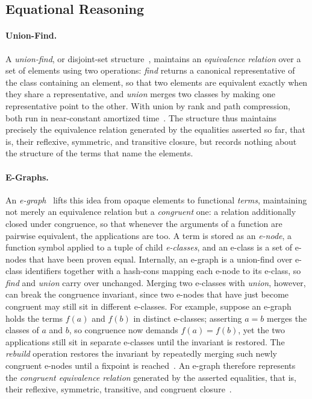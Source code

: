 \subsection{Equational Reasoning}

\paragraph{Union-Find.}
A \textit{union-find}, or disjoint-set structure~\cite{tarjan1975union},
maintains an \textit{equivalence relation} over a set of elements using two
operations: \textit{find} returns a canonical representative of the class
containing an element, so that two elements are equivalent exactly when they
share a representative, and \textit{union} merges two classes by making one
representative point to the other. With union by rank and path compression, both
run in near-constant amortized time~\cite{tarjan1984worstcase}. The structure
thus maintains precisely the equivalence relation generated by the equalities
asserted so far, that is, their reflexive, symmetric, and transitive closure, but
records nothing about the structure of the terms that name the elements.

\paragraph{E-Graphs.}
An \textit{e-graph}~\cite{nelson1980congruence, willsey2021egg} lifts this idea
from opaque elements to functional \textit{terms}, maintaining not merely an equivalence
relation but a \textit{congruent} one: a relation additionally closed under
congruence, so that whenever the arguments of a function are pairwise
equivalent, the applications are too. A term is stored as an \textit{e-node}, a
function symbol applied to a tuple of child \textit{e-classes}, and an e-class is
a set of e-nodes that have been proven equal. Internally, an e-graph is a
union-find over e-class identifiers together with a hash-cons mapping each e-node
to its e-class, so \textit{find} and \textit{union} carry over unchanged.
Merging two e-classes with \textit{union}, however, can break the congruence
invariant, since two e-nodes that have just become congruent may still sit in
different e-classes. For example, suppose an e-graph holds the terms $f(a)$ and
$f(b)$ in distinct e-classes; asserting $a = b$ merges the classes of $a$ and
$b$, so congruence now demands $f(a) = f(b)$, yet the two applications still sit
in separate e-classes until the invariant is restored. The \textit{rebuild}
operation restores the invariant by
repeatedly merging such newly congruent e-nodes until a fixpoint is
reached~\cite{willsey2021egg}. An e-graph therefore represents the
\textit{congruent equivalence relation} generated by the asserted equalities,
that is, their reflexive, symmetric, transitive, and congruent
closure~\cite{zakhour2025disequality}.

